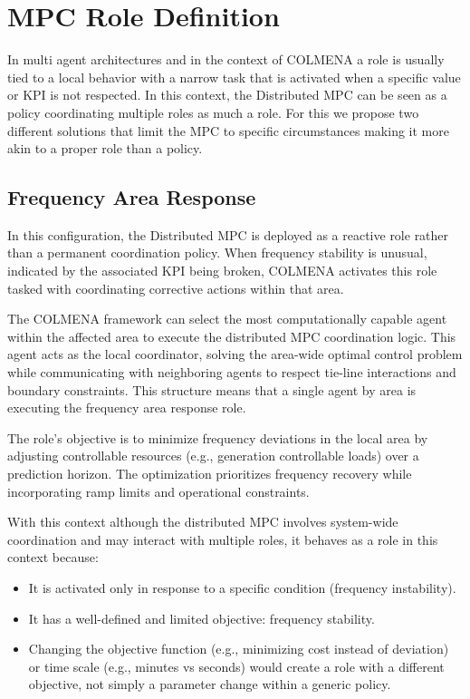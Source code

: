 \documentclass{article}
\begin{document}
\newpage
\section{MPC Role Definition}

In multi agent architectures and in the context of COLMENA a role is usually tied to a local behavior with a narrow task that is activated when a specific value or KPI is not respected. In this context, the Distributed MPC can be seen as a policy coordinating multiple roles as much a role. For this we propose two different solutions that limit the MPC to specific circumstances making it more akin to a proper role than a policy.

\subsection{Frequency Area Response}

In this configuration, the Distributed MPC is deployed as a reactive role rather than a permanent coordination policy. When frequency stability is unusual, indicated by the associated KPI being broken, COLMENA activates this role tasked with coordinating corrective actions within that area.

The COLMENA framework can select the most computationally capable agent within the affected area to execute the distributed MPC coordination logic. This agent acts as the local coordinator, solving the area-wide optimal control problem while communicating with neighboring agents to respect tie-line interactions and boundary constraints. This structure means that a single agent by area is executing the frequency area response role.

The role's objective is to minimize frequency deviations in the local area by adjusting controllable resources (e.g., generation controllable loads) over a prediction horizon. The optimization prioritizes frequency recovery while incorporating ramp limits and operational constraints.
 
With this context although the distributed MPC involves system-wide coordination and may interact with multiple roles, it behaves as a role in this context because:
\begin{itemize}
    \item It is activated only in response to a specific condition (frequency instability).
    \item It has a well-defined and limited objective: frequency stability.
    \item Changing the objective function (e.g., minimizing cost instead of deviation) or time scale (e.g., minutes vs seconds) would create a role with a different objective, not simply a parameter change within a generic policy.
\end{itemize}
\end{document}
